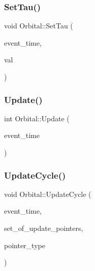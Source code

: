 \mbox{\label{classOrbital_afd09baa67f1a9bff08c74dcf60e1398a}} 
\subsubsection{\texorpdfstring{Set\+Tau()}{SetTau()}}
{\footnotesize\ttfamily void Orbital\+::\+Set\+Tau (\begin{DoxyParamCaption}\item[{std\+::chrono\+::time\+\_\+point$<$ \mbox{\hyperlink{universe_8h_a0ef8d951d1ca5ab3cfaf7ab4c7a6fd80}{Clock}} $>$}]{event\+\_\+time,  }\item[{double}]{val }\end{DoxyParamCaption})\hspace{0.3cm}{\ttfamily [inline]}}

\mbox{\label{classOrbital_a837289c3b2af844724c381707dee40d0}} 
\subsubsection{\texorpdfstring{Update()}{Update()}}
{\footnotesize\ttfamily int Orbital\+::\+Update (\begin{DoxyParamCaption}\item[{std\+::chrono\+::time\+\_\+point$<$ \mbox{\hyperlink{universe_8h_a0ef8d951d1ca5ab3cfaf7ab4c7a6fd80}{Clock}} $>$}]{event\+\_\+time }\end{DoxyParamCaption})\hspace{0.3cm}{\ttfamily [virtual]}}

\mbox{\label{classOrbital_afbf72ba4e260627422c9f53dea793923}} 
\subsubsection{\texorpdfstring{Update\+Cycle()}{UpdateCycle()}}
{\footnotesize\ttfamily void Orbital\+::\+Update\+Cycle (\begin{DoxyParamCaption}\item[{std\+::chrono\+::time\+\_\+point$<$ \mbox{\hyperlink{universe_8h_a0ef8d951d1ca5ab3cfaf7ab4c7a6fd80}{Clock}} $>$}]{event\+\_\+time,  }\item[{std\+::vector$<$ \mbox{\hyperlink{classCognitiveNetwork}{Cognitive\+Network}} $\ast$$>$}]{set\+\_\+of\+\_\+update\+\_\+pointers,  }\item[{unsigned int}]{pointer\+\_\+type }\end{DoxyParamCaption})}



